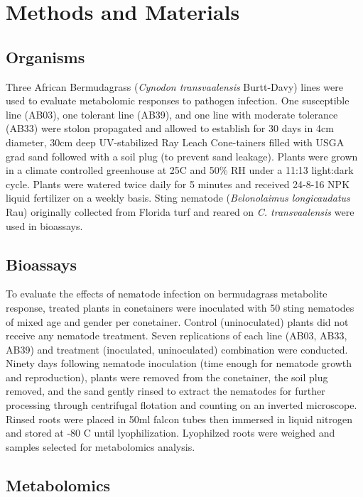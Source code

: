 \documentclass[9pt,lineno]{elife}
\begin{document}
\section{Methods and Materials}


\subsection{Organisms}

Three African Bermudagrass (\textit{Cynodon transvaalensis} Burtt-Davy) lines were used to evaluate metabolomic responses to pathogen infection.  One susceptible line (AB03), one tolerant line (AB39), and one line with moderate tolerance (AB33) were stolon propagated and allowed to establish for 30 days in 4cm diameter, 30cm deep UV-stabilized Ray Leach Cone-tainers filled with USGA grad sand followed with a soil plug (to prevent sand leakage). Plants were grown in a climate controlled greenhouse at 25C and 50\% RH under a 11:13 light:dark cycle.  Plants were watered twice daily for 5 minutes and received 24-8-16 NPK liquid fertilizer on a weekly basis.  Sting nematode (\textit{Belonolaimus longicaudatus} Rau) originally collected from Florida turf and reared on \textit{C. transvaalensis} were used in bioassays. 

\subsection{Bioassays}

To evaluate the effects of nematode infection on bermudagrass metabolite response, treated plants in conetainers were inoculated with 50 sting nematodes of mixed age and gender per conetainer.  Control (uninoculated) plants did not receive any nematode treatment. Seven replications of each line (AB03, AB33, AB39) and treatment (inoculated, uninoculated) combination were conducted.  Ninety days following nematode inoculation (time enough for nematode growth and reproduction), plants were removed from the conetainer, the soil plug removed, and the sand gently rinsed to extract the nematodes for further processing through centrifugal flotation and counting on an inverted microscope.  Rinsed roots were placed in 50ml falcon tubes then immersed in liquid nitrogen and stored at -80 C until lyophilization.  Lyophilzed roots were weighed and samples selected for metabolomics analysis. 

\subsection{Metabolomics}
\end{document}
